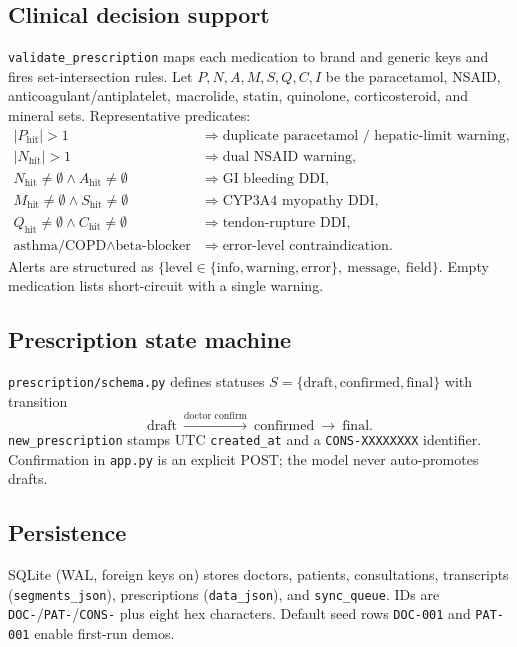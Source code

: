 \documentclass[11pt,a4paper]{article}
\begin{document}
\subsection{Clinical decision support}
\texttt{validate\_prescription} maps each medication to brand and generic keys and fires set-intersection rules. Let $P, N, A, M, S, Q, C, I$ be the paracetamol, NSAID, anticoagulant/antiplatelet, macrolide, statin, quinolone, corticosteroid, and mineral sets. Representative predicates:
\begin{align}
  |P_{\text{hit}}|>1 &\Rightarrow \text{duplicate paracetamol / hepatic-limit warning}, \\
  |N_{\text{hit}}|>1 &\Rightarrow \text{dual NSAID warning}, \\
  N_{\text{hit}}\neq\emptyset \wedge A_{\text{hit}}\neq\emptyset &\Rightarrow \text{GI bleeding DDI}, \\
  M_{\text{hit}}\neq\emptyset \wedge S_{\text{hit}}\neq\emptyset &\Rightarrow \text{CYP3A4 myopathy DDI}, \\
  Q_{\text{hit}}\neq\emptyset \wedge C_{\text{hit}}\neq\emptyset &\Rightarrow \text{tendon-rupture DDI}, \\
  \text{asthma/COPD}\wedge \text{beta-blocker} &\Rightarrow \text{error-level contraindication}.
\end{align}
Alerts are structured as $\{\text{level}\in\{\text{info},\text{warning},\text{error}\},\ \text{message},\ \text{field}\}$. Empty medication lists short-circuit with a single warning.

\subsection{Prescription state machine}
\texttt{prescription/schema.py} defines statuses $S=\{\text{draft},\text{confirmed},\text{final}\}$ with transition
\begin{equation}
  \text{draft}\ \xrightarrow{\text{doctor confirm}}\ \text{confirmed}\ \rightarrow\ \text{final}.
\end{equation}
\texttt{new\_prescription} stamps UTC \texttt{created\_at} and a \texttt{CONS-XXXXXXXX} identifier. Confirmation in \texttt{app.py} is an explicit POST; the model never auto-promotes drafts.

\subsection{Persistence}
SQLite (WAL, foreign keys on) stores doctors, patients, consultations, transcripts (\texttt{segments\_json}), prescriptions (\texttt{data\_json}), and \texttt{sync\_queue}. IDs are \texttt{DOC-}/\texttt{PAT-}/\texttt{CONS-} plus eight hex characters. Default seed rows \texttt{DOC-001} and \texttt{PAT-001} enable first-run demos.
\end{document}
